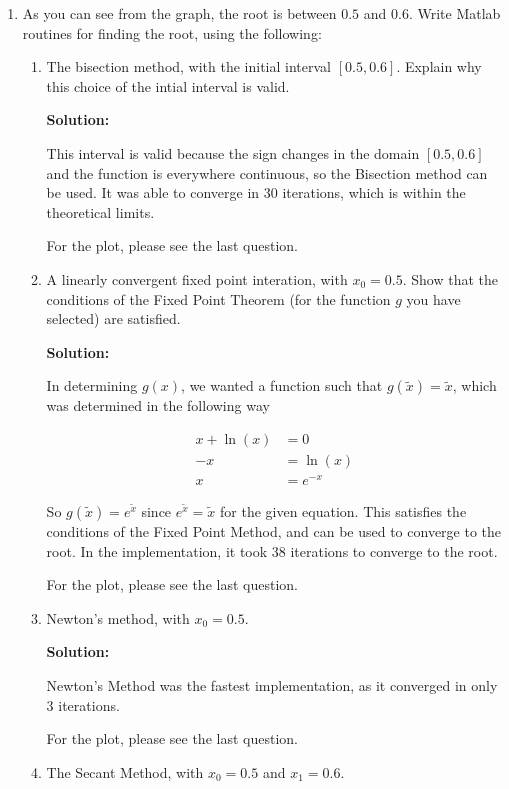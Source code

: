 \documentclass[12pt]{article}
\begin{document}
\begin{enumerate}
\begin{enumerate}
  \item As you can see from the graph, the root is between $0.5$ and $0.6$. Write
  {\sc Matlab} routines for finding the root, using the following:
  \begin{enumerate}
    \item The bisection method, with the initial interval $[0.5,0.6]$. Explain
    why this choice of the intial interval is valid.

    {\bf Solution:}

    This interval is valid because the sign changes in the domain $[0.5, 0.6]$ and
    the function is everywhere continuous, so the Bisection method can be used.
    It was able to converge in 30 iterations, which is within the theoretical limits.

    For the plot, please see the last question.

    \item A linearly convergent fixed point interation, with $x_{0} = 0.5$. Show that
    the conditions of the Fixed Point Theorem (for the function $g$ you have selected)
    are satisfied.

    {\bf Solution:}

    In determining $g(x)$, we wanted a function such that $g\left(\widetilde{x}\right) = \widetilde{x}$,
    which was determined in the following way

    \begin{align*}
      x + \ln(x) &= 0\\
      -x &= \ln(x)\\
      x &= e^{-x}
    \end{align*}

    So $g\left( \widetilde{x}\right) = e^{\widetilde{x}}$ since $e^{\widetilde{x}} = \widetilde{x}$ for the given equation.
    This satisfies the conditions of the Fixed Point Method, and can be used to
    converge to the root. In the implementation, it took 38 iterations to converge to the root.

    For the plot, please see the last question.

    \item Newton's method, with $x_{0} = 0.5$.

    {\bf Solution:}

    Newton's Method was the fastest implementation, as it converged in only 3 iterations.

    For the plot, please see the last question.

    \item The Secant Method, with $x_{0} = 0.5$ and $x_{1} = 0.6$.


\end{enumerate}
\end{enumerate}
\end{enumerate}
\end{document}
